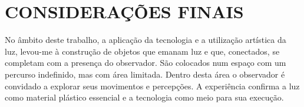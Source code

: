 \chapter{CONSIDERAÇÕES FINAIS}

No âmbito deste trabalho, a aplicação da tecnologia e a utilização artística da luz, levou-me à construção de objetos que emanam luz e que, conectados, se completam com a presença do observador. São colocados num espaço com um percurso indefinido, mas com área limitada. Dentro desta área o observador é convidado a explorar seus movimentos e percepções. A experiência confirma a luz como material plástico essencial e a tecnologia como meio para sua execução.
